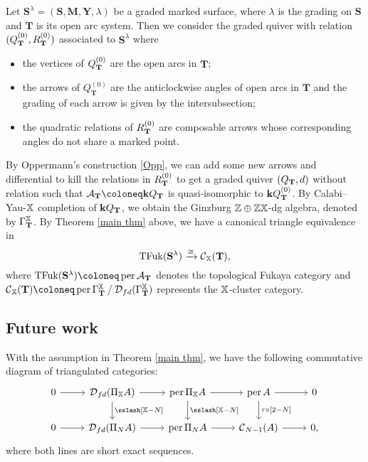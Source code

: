 \begin{example}\cite{Q12}
  Let $\mathbf{S}^{\lambda} = (\mathbf{S},\mathbf{M},\mathbf{Y},\lambda)$
  be a graded marked surface,
  where $\lambda$ is the grading on $\mathbf{S}$
  and $\mathbf{T}$ is its open arc system.
  Then we consider the graded quiver with relation $(Q^{(0)}_{\mathbf{T}},R^{(0)}_{\mathbf{T}})$
  associated to $\mathbf{S}^{\lambda}$ where
  \begin{itemize}
    \item the vertices of $Q^{(0)}_{\mathbf{T}}$ are the open arcs in $\mathbf{T}$;
    \item the arrows of $Q^{(0)}_{\mathbf{T}}$
      are the anticlockwise angles of open arcs in $\mathbf{T}$
      and the grading of each arrow is given by the intersubsection;
    \item the quadratic relations of $R^{(0)}_{\mathbf{T}}$ are composable arrows
      whose corresponding angles do not share a marked point.
  \end{itemize}
  By Oppermann's construction \ref{Opp},
  we can add some new arrows and differential
  to kill the relations in $R^{(0)}_{\mathbf{T}}$ to get a graded quiver $(Q_{\mathbf{T}}, d)$
  without relation such that $\mathcal{A}_{\TT} \coloneq \Bk Q_{\TT}$
  is quasi-isomorphic to $\mathbf{k} Q^{(0)}_{\mathbf{T}}$.
  By Calabi--Yau-$\mathbb{X}$ completion of $\mathbf{k} Q_{\mathbf{T}}$,
  we obtain the Ginzburg $\mathbb{Z}\oplus \mathbb{Z}\mathbb{X}$-dg algebra,
  denoted by $\Gamma_{\mathbf{T}}^{\mathbb{X}}$.
  By Theorem \ref{main thm} above,
  we have a canonical triangle equivalence in \cite[Theorem 4.7]{Q12}
  \[ \operatorname{TFuk}(\mathbf{S}^{\lambda}) \xrightarrow{\cong} \operatorname{\mathcal{C}}_{\mathbb{X}}(\mathbf{T}), \]
  where $\TFuk(\mathbf{S}^{\lambda}) \coloneq \per \mathcal{A}_{\TT}$
  denotes the topological Fukaya category and
  $\Ce_{\XX}(\TT) \coloneq \per \Gamma_{\TT}^{\XX} \quot \D_{fd}(\Gamma_{\TT}^{\XX})$
  represents the $\mathbb{X}$-cluster category.
\end{example}
\subsection{Future work}
\begin{corollary}\label{Cor}
  With the assumption in Theorem \ref{main thm},
  we have the following commutative diagram of triangulated categories:
  \[
    \begin{tikzcd}
      0 \ar[r] & \D_{fd}(\Pi_{\XX}A) \ar[r] \ar[d, "{\quott [\XX-N]}"]
               & \per\Pi_{\XX}A \ar[r] \ar[d, "{\quott [\XX-N]}"]
               & \per A \ar[r] \ar[d, "{\tau\circ[2-N]}"] & 0 \\
      0\ar[r] & \D_{fd}(\Pi_NA) \ar[r] & \per\Pi_NA \ar[r] & \Ce_{N-1}(A) \ar[r] &0,
    \end{tikzcd}
  \]
  where both lines are short exact sequences.
\end{corollary}

